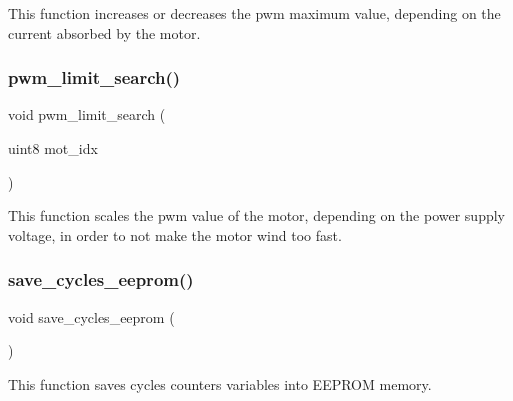 This function increases or decreases the pwm maximum value, depending on the current absorbed by the motor. \mbox{\label{interruptions_8h_ac7305eeb40ebfb2c0d67725aa2e88f78}} 
\subsubsection{pwm\+\_\+limit\+\_\+search()}
{\footnotesize\ttfamily void pwm\+\_\+limit\+\_\+search (\begin{DoxyParamCaption}\item[{uint8}]{mot\+\_\+idx }\end{DoxyParamCaption})}

This function scales the pwm value of the motor, depending on the power supply voltage, in order to not make the motor wind too fast. \mbox{\label{interruptions_8h_ad86170580c30277d97216739e8508a13}} 
\subsubsection{save\+\_\+cycles\+\_\+eeprom()}
{\footnotesize\ttfamily void save\+\_\+cycles\+\_\+eeprom (\begin{DoxyParamCaption}{ }\end{DoxyParamCaption})}

This function saves cycles counters variables into E\+E\+P\+R\+OM memory. 